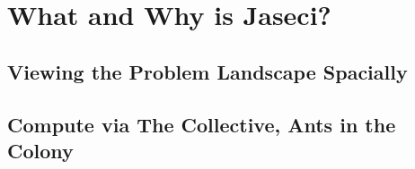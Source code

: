 \chapter{What and Why is Jaseci?}
\section{Viewing the Problem Landscape Spacially}
\section{Compute via The Collective, Ants in the Colony}